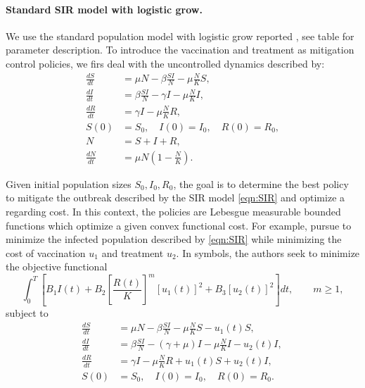 \paragraph{Standard SIR model with logistic grow.}
We use the standard population model with logistic grow reported
\cite{Schaefer2009}, see table for parameter description. To introduce the 
vaccination and treatment as mitigation control policies, we firs deal with the
uncontrolled dynamics described by:
\begin{equation}\label{eqn:SIR}
	\begin{aligned}
		\frac{dS}{dt} &=
			\mu N  
			- \beta \frac{S I}{N} 
			- \mu \frac{N}{K} S ,
		\\
		\frac{dI}{dt} &=
			\beta \frac{S I}{N}
			- \gamma I
			- \mu \frac{N}{K} I,
		\\
		\frac{dR}{dt} &= 
			\gamma I 
			- \mu \frac{N}{K} R ,
		\\
		S(0) &= S_0, \quad
		I(0) = I_0, \quad
		R(0) = R_0,
		\\
		N &= S + I +R,
		\\
		\frac{dN}{dt} &=
			\mu N 
			\left(
				1 - \frac{N}{K}
			\right).
	\end{aligned}
\end{equation}

Given initial population sizes $S_0, I_0, R_0$, the goal is to determine the best policy to
mitigate the outbreak described by the SIR model \eqref{eqn:SIR} and optimize a regarding  cost. In this context, the policies are Lebesgue measurable bounded functions
which optimize a given convex functional cost. For example, \citeauthor{Schaefer2009} pursue to minimize the infected population described by \eqref{eqn:SIR} while minimizing the cost of vaccination $u_1$ and treatment $u_2$. In symbols, the authors seek to minimize the objective functional
\begin{equation}
	\int_{0}^T	
		\left[
			B_1 I(t) 
			+ B_2 \left[\frac{R(t)}{K}\right]^m [u_1(t)]^2 + B_3 [u_2(t)]^2
		\right] dt,
		\qquad  m\geq 1,
\end{equation}
subject to
\begin{equation}
	\begin{aligned}
		\frac{dS}{dt} &=
			\mu N  
			- \beta \frac{S I}{N} 
			- \mu \frac{N}{K} S - u_1(t) S,
		\\
		\frac{dI}{dt} &=
			\beta \frac{S I}{N}
			- (\gamma  + \mu) I 
			- \mu \frac{N}{K} I
			- u_2(t) I,
		\\
		\frac{dR}{dt} &= 
			\gamma I 
			- \mu \frac{N}{K} R 
			+ u_1(t) S 
			+ u_2(t) I,
		\\
		S(0) &= S_0, \quad
		I(0) = I_0, \quad
		R(0) = R_0. \quad
	\end{aligned}
\end{equation}